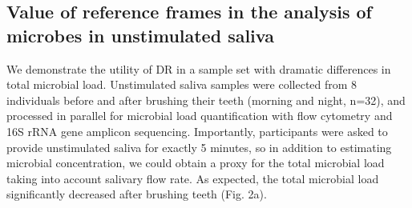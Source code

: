 \subsection{Value of reference frames in the analysis of microbes in unstimulated saliva}
We demonstrate the utility of DR in a sample set with dramatic differences in total microbial load. Unstimulated saliva samples were collected from 8 individuals before and after brushing their teeth (morning and night, n=32), and processed in parallel for microbial load quantification with flow cytometry and 16S rRNA gene amplicon sequencing. Importantly, participants were asked to provide unstimulated saliva for exactly 5 minutes, so in addition to estimating microbial concentration, we could obtain a proxy for the total microbial load taking into account salivary flow rate. As expected, the total microbial load significantly decreased after brushing teeth (Fig. 2a).


